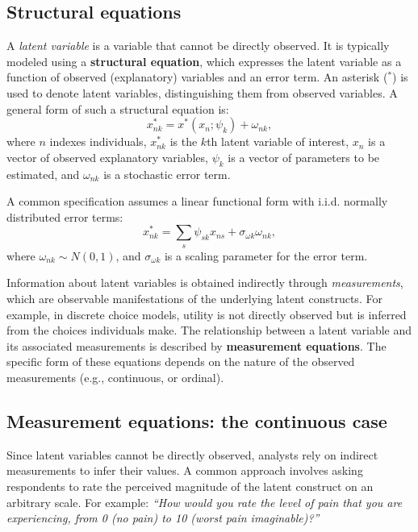 \documentclass[12pt,a4paper]{article}
\begin{document}
\subsection{Structural equations}
A \emph{latent variable} is a variable that cannot be directly
observed. It is typically modeled using a \textbf{structural
  equation}, which expresses the latent variable as a function of
observed (explanatory) variables and an error term. An asterisk
(\(^*\)) is used to denote latent variables, distinguishing them from
observed variables.  A general form of such a structural equation is:
\begin{equation}
\label{eq:structural}
x_{nk}^* = x^*(x_n; \psi_k) + \omega_{nk},
\end{equation}
where $n$ indexes individuals, $x_{nk}^*$ is the $k$th latent variable
of interest, $x_n$ is a vector of observed explanatory variables,
$\psi_k$ is a vector of parameters to be estimated, and $\omega_{nk}$
is a stochastic error term.

A common specification assumes a linear functional form with
i.i.d. normally distributed error terms:
\begin{equation}
\label{eq:linearStructural}
 x_{nk}^* = \sum_s \psi_{sk} x_{ns} + \sigma_{\omega k} \omega_{nk},
\end{equation}
where $\omega_{nk} \sim N(0, 1)$, and $\sigma_{\omega k}$ is a scaling
parameter for the error term.

Information about latent variables is obtained indirectly through
\emph{measurements}, which are observable manifestations of the
underlying latent constructs. For example, in discrete choice models,
utility is not directly observed but is inferred from the choices
individuals make. The relationship between a latent variable and its
associated measurements is described by \textbf{measurement
  equations}. The specific form of these equations depends on the
nature of the observed measurements (e.g., continuous, or ordinal).


\subsection{Measurement equations: the continuous case}
\label{sec:continuous}

Since latent variables cannot be directly observed, analysts rely on
indirect measurements to infer their values. A common approach
involves asking respondents to rate the perceived magnitude of the
latent construct on an arbitrary scale. For example: \emph{``How would
you rate the level of pain that you are experiencing, from 0 (no pain)
to 10 (worst pain imaginable)?''}
\end{document}
